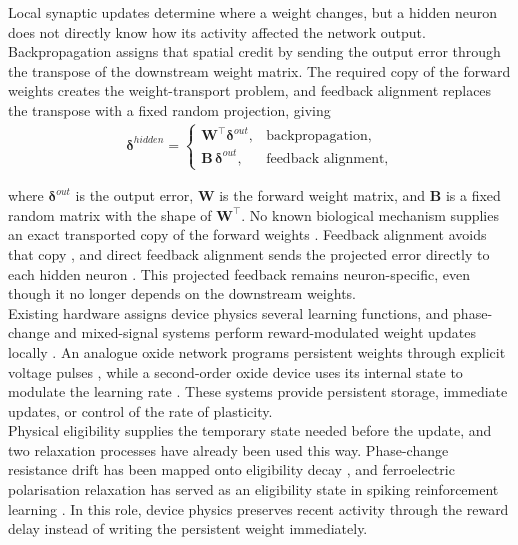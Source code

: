 \noindent Local synaptic updates determine where a weight changes, but a hidden neuron does not directly know
how its activity affected the network output. Backpropagation assigns that spatial credit by sending the output error
through the transpose of the downstream weight matrix. The required copy of the forward weights creates the
weight-transport problem, and feedback alignment replaces the transpose with a fixed random projection, giving
\begin{align}
    \boldsymbol{\delta}^{hidden} = \begin{cases}
    \mathbf{W}^{\top} \boldsymbol{\delta}^{out}, & \text{backpropagation}, \\[2pt]
    \mathbf{B}\, \boldsymbol{\delta}^{out},      & \text{feedback alignment},
\end{cases} \label{eq:2.9}
\end{align}

\noindent where $\boldsymbol{\delta}^{out}$ is the output error, $\mathbf{W}$ is the forward weight matrix, and
$\mathbf{B}$ is a fixed random matrix with the shape of $\mathbf{W}^{\top}$. No known biological mechanism supplies
an exact transported copy of the forward weights \cite{grossberg1987competitive}. Feedback alignment avoids that
copy \cite{lillicrap2016random}, and direct feedback alignment sends the projected error directly to each hidden
neuron \cite{nokland2016direct}. This projected feedback remains neuron-specific, even though it no longer depends on
the downstream weights.\\

\noindent Existing hardware assigns device physics several learning functions, and phase-change and mixed-signal
systems perform reward-modulated weight updates locally \cite{bianchi2020bio, bohnstingl2019learns}. An analogue
oxide network programs persistent weights through explicit voltage pulses \cite{portner2025actorcritic}, while a
second-order oxide device uses its internal state to modulate the learning rate \cite{ming2026oxygen}. These systems
provide persistent storage, immediate updates, or control of the rate of plasticity.\\

\noindent Physical eligibility supplies the temporary state needed before the update, and two relaxation processes
have already been used this way. Phase-change resistance drift has been mapped onto eligibility decay
\cite{demirag2021pcmtrace}, and ferroelectric polarisation relaxation has served as an eligibility state in spiking
reinforcement learning \cite{wang2026ferroelectric}. In this role, device physics preserves recent activity through
the reward delay instead of writing the persistent weight immediately.

